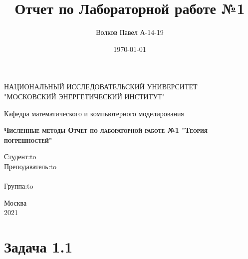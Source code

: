 \documentclass[a4paper,12pt]{report} %
\author{Волков Павел А-14-19}
\title{Отчет по Лабораторной работе №1}
\date{\today}
\begin{document}
\begin{titlepage}
	\newpage

	\begin{center}
	НАЦИОНАЛЬНЫЙ ИССЛЕДОВАТЕЛЬСКИЙ УНИВЕРСИТЕТ\\
		"МОСКОВСКИЙ ЭНЕРГЕТИЧЕСКИЙ ИНСТИТУТ"\\
	\end{center}

	\vspace{8em}	

	\begin{center}
		\Large Кафедра математического и компьютерного моделирования\\ 
	\end{center}

	\vspace{2em}

	\begin{center}
		\textsc{\textbf{ \Large Численные методы \linebreak Отчет по лабораторной работе №1 \linebreak "Теория погрешностей"}}
	\end{center}

	\vspace{6em}



	\newbox{\lbox}
	\newlength{\maxl}
	\setlength{\maxl}{\wd\lbox}
	\hfill\parbox{11cm}{
		\hspace*{5cm}\hspace*{-5cm}Студент:\hfill\hbox to\\
		\hspace*{5cm}\hspace*{-5cm}Преподаватель:\hfill\hbox to\\
		\\
		\hspace*{5cm}\hspace*{-5cm}Группа:\hfill\hbox to\\
	}


	\vspace{\fill}

	\begin{center}
		Москва \\2021
	\end{center}

\end{titlepage}

\section*{Задача 1.1}
\end{document}
